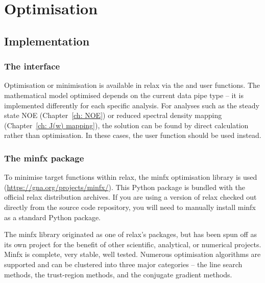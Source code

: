 
\chapter{Optimisation}
\label{ch: optimisation}




\section{Implementation}




\subsection{The interface}

Optimisation or minimisation is available in relax via the  and  user functions.
The mathematical model optimised depends on the current data pipe type -- it is implemented differently for each specific analysis.
For analyses such as the steady state NOE (Chapter~\ref{ch: NOE}) or reduced spectral density mapping (Chapter~\ref{ch: J(w) mapping}), the solution can be found by direct calculation rather than optimisation.
In these cases, the  user function should be used instead.




\subsection{The minfx package}

To minimise target functions within relax, the minfx optimisation library is used (\href{https://gna.org/projects/minfx/}{https://gna.org/projects/minfx/}).
This Python package is bundled with the official relax distribution archives.
If you are using a version of relax checked out directly from the source code repository, you will need to manually install minfx as a standard Python package.

The minfx library originated as one of relax's packages, but has been spun off as its own project for the benefit of other scientific, analytical, or numerical projects. 
Minfx is complete, very stable, well tested.
Numerous optimisation algorithms are supported and can be clustered into three major categories -- the line search methods, the trust-region methods, and the conjugate gradient methods.

